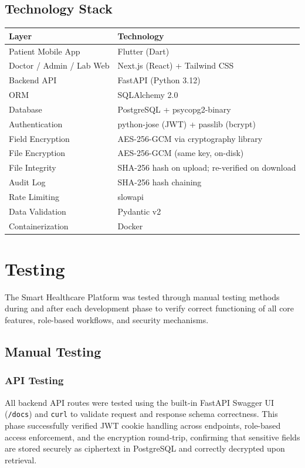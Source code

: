 \documentclass[a4paper,12pt]{report}
\begin{document}
\section{Technology Stack}

\begin{center}
\renewcommand{\arraystretch}{1.4}
\begin{tabular}{ll}
\toprule
\textbf{Layer} & \textbf{Technology} \\
\midrule
Patient Mobile App & Flutter (Dart) \\
Doctor / Admin / Lab Web & Next.js (React) + Tailwind CSS \\
Backend API & FastAPI (Python 3.12) \\
ORM & SQLAlchemy 2.0 \\
Database & PostgreSQL + psycopg2-binary \\
Authentication & python-jose (JWT) + passlib (bcrypt) \\
Field Encryption & AES-256-GCM via cryptography library \\
File Encryption & AES-256-GCM (same key, on-disk) \\
File Integrity & SHA-256 hash on upload; re-verified on download \\
Audit Log & SHA-256 hash chaining \\
Rate Limiting & slowapi \\
Data Validation & Pydantic v2 \\
Containerization & Docker \\
\bottomrule
\end{tabular}
\end{center}


\chapter{Testing}

The Smart Healthcare Platform was tested through manual testing methods during and after each development phase to verify correct functioning of all core features, role-based workflows, and security mechanisms.

\section{Manual Testing}

\subsection{API Testing}
All backend API routes were tested using the built-in FastAPI Swagger UI (\texttt{/docs}) and \texttt{curl} to validate request and response schema correctness. This phase successfully verified JWT cookie handling across endpoints, role-based access enforcement, and the encryption round-trip, confirming that sensitive fields are stored securely as ciphertext in PostgreSQL and correctly decrypted upon retrieval.
\end{document}
